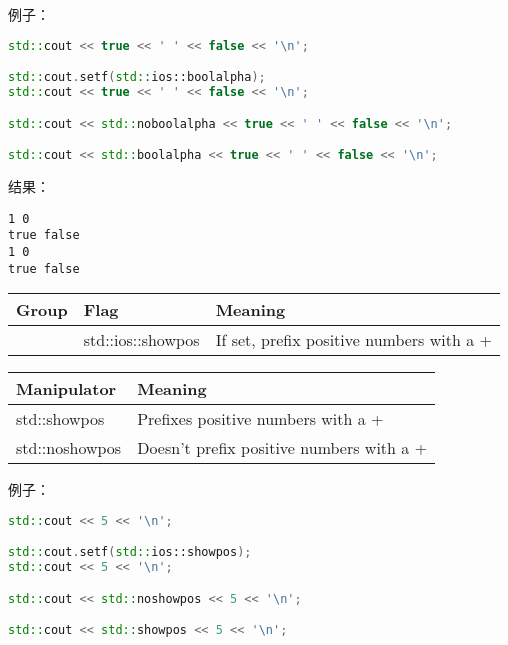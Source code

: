 \documentclass[../../LearnCpp.tex]{subfiles}
\begin{document}
例子：

\begin{lstlisting}[language=C++]
std::cout << true << ' ' << false << '\n';

std::cout.setf(std::ios::boolalpha);
std::cout << true << ' ' << false << '\n';

std::cout << std::noboolalpha << true << ' ' << false << '\n';

std::cout << std::boolalpha << true << ' ' << false << '\n';
\end{lstlisting}

结果：

\begin{lstlisting}
1 0
true false
1 0
true false
\end{lstlisting}


\begin{center}
  \begin{tiny}
    \begin{tabularx}{ 1\textwidth}{
        | >{\raggedright\arraybackslash}X
        | >{\raggedright\arraybackslash}X
        | >{\raggedright\arraybackslash}X |
      }
      \hline
      Group & Flag              & Meaning                                  \\
      \hline
            & std::ios::showpos & If set, prefix positive numbers with a + \\
      \hline
    \end{tabularx}
  \end{tiny}
\end{center}

\begin{center}
  \begin{tiny}
    \begin{tabularx}{ 1\textwidth}{
        | >{\raggedright\arraybackslash}X
        | >{\raggedright\arraybackslash}X |
      }
      \hline
      Manipulator    & Meaning                                  \\
      \hline
      std::showpos   & Prefixes positive numbers with a +       \\
      std::noshowpos & Doesn’t prefix positive numbers with a + \\
      \hline
    \end{tabularx}
  \end{tiny}
\end{center}

例子：

\begin{lstlisting}[language=C++]
std::cout << 5 << '\n';

std::cout.setf(std::ios::showpos);
std::cout << 5 << '\n';

std::cout << std::noshowpos << 5 << '\n';

std::cout << std::showpos << 5 << '\n';
\end{lstlisting}
\end{document}
